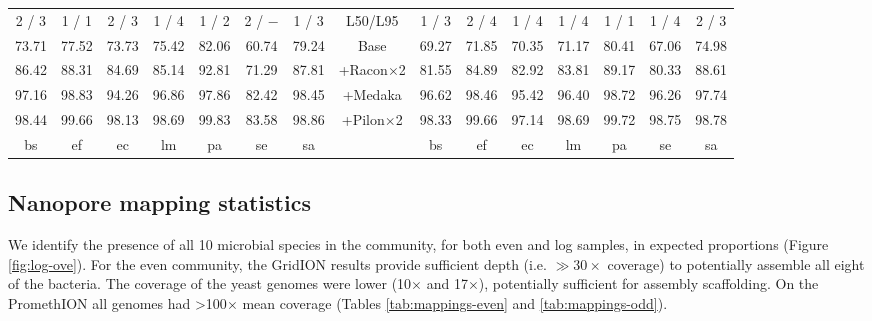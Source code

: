 \documentclass[a4paper,num-refs]{oup-contemporary}
\begin{document}
\begin{table}[t!]
\begin{tabular}{ccccccc|cc|ccccccc}
2 / 3   &       1 / 1   &       2 / 3   &       1 / 4   &       1 / 2   &       2 / $-$ &       1 / 3   &       \multicolumn{2}{c|}{L50/L95}    &       1 / 3   &       2 / 4   &       1 / 4   &       1 / 4   &       1 / 1   &       1 / 4   &       2 / 3\\
73.71   &       77.52   &       73.73   &       75.42   &       82.06   &       60.74   &       79.24   &       \multicolumn{2}{c|}{Base}       &       69.27   &       71.85   &       70.35   &       71.17   &       80.41   &       67.06   &       74.98\\
86.42   &       88.31   &       84.69   &       85.14   &       92.81   &       71.29   &       87.81   &       \multicolumn{2}{c|}{+Racon$\times$2}    &       81.55   &       84.89   &       82.92   &       83.81   &       89.17   &       80.33   &       88.61\\
97.16   &       98.83   &       94.26   &       96.86   &       97.86   &       82.42   &       98.45   &       \multicolumn{2}{c|}{+Medaka}    &       96.62   &       98.46   &       95.42   &       96.40   &       98.72   &       96.26   &       97.74\\
98.44   &       99.66   &       98.13   &       98.69   &       99.83   &       83.58   &       98.86   &       \multicolumn{2}{c|}{+Pilon$\times$2}    &       98.33   &       99.66   &       97.14   &       98.69   &       99.72   &       98.75   &       98.78\\
\midrule
bs      &       ef      &       ec      &       lm      &       pa      &       se      &       sa      &       \multicolumn{2}{c|}{}   &       bs      &       ef      &       ec      &       lm      &       pa      &       se      &       sa\\
\end{tabular}
\end{table}









\subsection{Nanopore mapping statistics}

We identify the presence of all 10 microbial species in the community, for both even and log samples, in expected proportions (Figure \ref{fig:log-ove}). For the even community, the GridION results provide sufficient depth (i.e. $\gg30\times$ coverage) to potentially assemble all eight of the bacteria. The coverage of the yeast genomes were lower (10$\times$ and 17$\times$), potentially sufficient for assembly scaffolding.
On the PromethION all genomes had >100$\times$ mean coverage (Tables \ref{tab:mappings-even} and \ref{tab:mappings-odd}).
\end{document}
